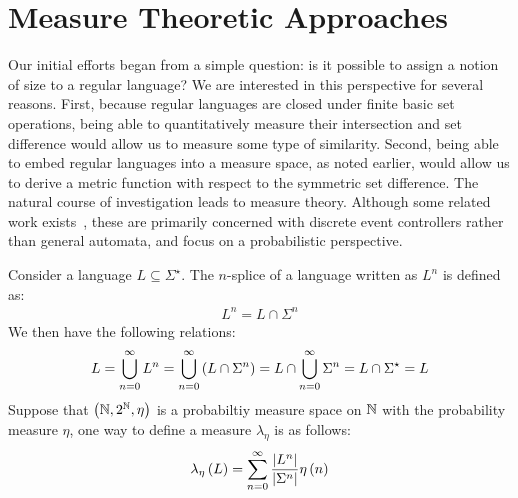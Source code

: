 
\section{Measure Theoretic Approaches}

Our initial efforts began from a simple question:
is it possible to assign a notion of size to a regular language?
We are interested in this perspective for several reasons.
First, because regular languages are closed under finite basic set operations,
being able to quantitatively measure their intersection and set
difference would allow us to measure some type of similarity.
Second, being able to embed regular languages into a measure space,
as noted earlier,
would allow us to derive a metric function with respect to the
symmetric set difference.
The natural course of investigation leads to measure theory.
Although some related work exists~\cite{ray2005signed},
these are primarily concerned with discrete event controllers
rather than general automata,
and focus on a probabilistic perspective.

Consider a language \(L \subseteq \Sigma^\star\).
The \(n\)-splice of a language written as \(L^n\) is defined as:
\begin{align*}
  L^n = L \cap \Sigma^n
\end{align*}
We then have the following relations:
\begin{align*}
  L
    = \bigcup_{n = 0}^{\infty} L^n
    = \bigcup_{n = 0}^{\infty} \left(L \cap \Sigma^n\right)
    = L \cap \bigcup_{n = 0}^{\infty} \Sigma^n
    = L \cap \Sigma^\star
    = L
\end{align*}
Suppose that \(\left(\mathbb{N}, 2^{\mathbb{N}}, \eta\right)\) is a probabiltiy measure space
on \(\mathbb{N}\) with the probability measure \(\eta\),
one way to define a measure \(\lambda_{\eta}\)
is as follows:
\begin{align*}
  \lambda_{\eta} \left(L\right)
    = \sum_{n = 0}^{\infty}
        \frac{\left\lvert L^n\right\rvert}{\left\lvert\Sigma^n\right\rvert} \eta\left(n\right)
\end{align*}

